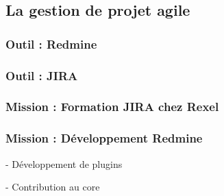 \subsection{La gestion de projet agile}

\subsubsection{Outil : Redmine}

\subsubsection{Outil : JIRA}

\subsubsection{Mission : Formation JIRA chez Rexel}

\subsubsection{Mission : Développement Redmine}

- Développement de plugins

- Contribution au core

